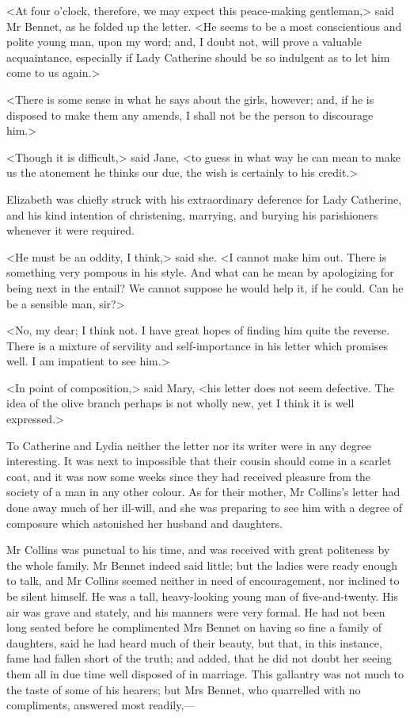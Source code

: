 <At four o'clock, therefore, we may expect this peace-making gentleman,> said Mr Bennet, as he folded up the letter. <He seems to be a most conscientious and polite young man, upon my word; and, I doubt not, will prove a valuable acquaintance, especially if Lady Catherine should be so indulgent as to let him come to us again.>

<There is some sense in what he says about the girls, however; and, if he is disposed to make them any amends, I shall not be the person to discourage him.>

<Though it is difficult,> said Jane, <to guess in what way he can mean to make us the atonement he thinks our due, the wish is certainly to his credit.>

Elizabeth was chiefly struck with his extraordinary deference for Lady Catherine, and his kind intention of christening, marrying, and burying his parishioners whenever it were required.

<He must be an oddity, I think,> said she. <I cannot make him out. There is something very pompous in his style. And what can he mean by apologizing for being next in the entail? We cannot suppose he would help it, if he could. Can he be a sensible man, sir?>

<No, my dear; I think not. I have great hopes of finding him quite the reverse. There is a mixture of servility and self-importance in his letter which promises well. I am impatient to see him.>

<In point of composition,> said Mary, <his letter does not seem defective. The idea of the olive branch perhaps is not wholly new, yet I think it is well expressed.>

To Catherine and Lydia neither the letter nor its writer were in any degree interesting. It was next to impossible that their cousin should come in a scarlet coat, and it was now some weeks since they had received pleasure from the society of a man in any other colour. As for their mother, Mr Collins's letter had done away much of her ill-will, and she was preparing to see him with a degree of composure which astonished her husband and daughters.

Mr Collins was punctual to his time, and was received with great politeness by the whole family. Mr Bennet indeed said little; but the ladies were ready enough to talk, and Mr Collins seemed neither in need of encouragement, nor inclined to be silent himself. He was a tall, heavy-looking young man of five-and-twenty. His air was grave and stately, and his manners were very formal. He had not been long seated before he complimented Mrs Bennet on having so fine a family of daughters, said he had heard much of their beauty, but that, in this instance, fame had fallen short of the truth; and added, that he did not doubt her seeing them all in due time well disposed of in marriage. This gallantry was not much to the taste of some of his hearers; but Mrs Bennet, who quarrelled with no compliments, answered most readily,—


